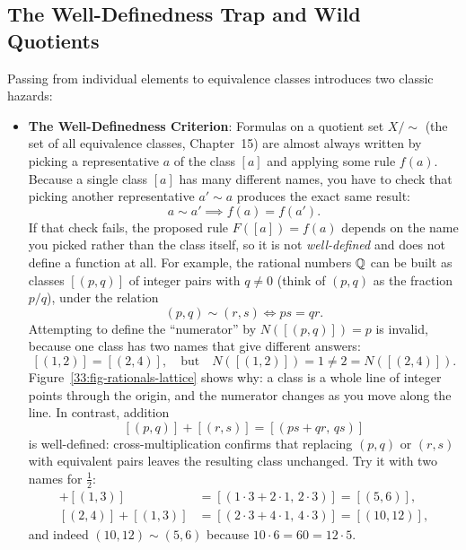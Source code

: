 \subsection{The Well-Definedness Trap and Wild Quotients}

Passing from individual elements to equivalence classes introduces two classic hazards:

\begin{itemize}
  \item \textbf{The Well-Definedness Criterion}: Formulas on a quotient set $X/\!\sim$ (the set of all equivalence classes, Chapter~15) are almost always written by picking a representative $a$ of the class $[a]$ and applying some rule $f(a)$. Because a single class $[a]$ has many different names, you have to check that picking another representative $a' \sim a$ produces the exact same result:
  \[
  a \sim a' \implies f(a) = f(a').
  \]
  If that check fails, the proposed rule $F([a]) = f(a)$ depends on the name you picked rather than the class itself, so it is not \emph{well-defined} and does not define a function at all. For example, the rational numbers $\mathbb{Q}$ can be built as classes $[(p, q)]$ of integer pairs with $q \neq 0$ (think of $(p, q)$ as the fraction $p/q$), under the relation
  \[
  (p, q) \sim (r, s) \iff ps = qr.
  \]
  Attempting to define the ``numerator'' by $N([(p, q)]) = p$ is invalid, because one class has two names that give different answers:
  \[
  [(1, 2)] = [(2, 4)], \quad\text{but}\quad N([(1, 2)]) = 1 \neq 2 = N([(2, 4)]).
  \]
  Figure~\ref{33:fig-rationals-lattice} shows why: a class is a whole line of integer points through the origin, and the numerator changes as you move along the line. In contrast, addition
  \[
  [(p, q)] + [(r, s)] = [(ps + qr,\, qs)]
  \]
  is well-defined: cross-multiplication confirms that replacing $(p, q)$ or $(r, s)$ with equivalent pairs leaves the resulting class unchanged. Try it with two names for $\tfrac12$:
  \begin{align*}
  [(1, 2)] + [(1, 3)] &= [(1 \cdot 3 + 2 \cdot 1,\, 2 \cdot 3)] = [(5, 6)],\\
  [(2, 4)] + [(1, 3)] &= [(2 \cdot 3 + 4 \cdot 1,\, 4 \cdot 3)] = [(10, 12)],
  \end{align*}
  and indeed $(10, 12) \sim (5, 6)$ because $10 \cdot 6 = 60 = 12 \cdot 5$.


\end{itemize}
